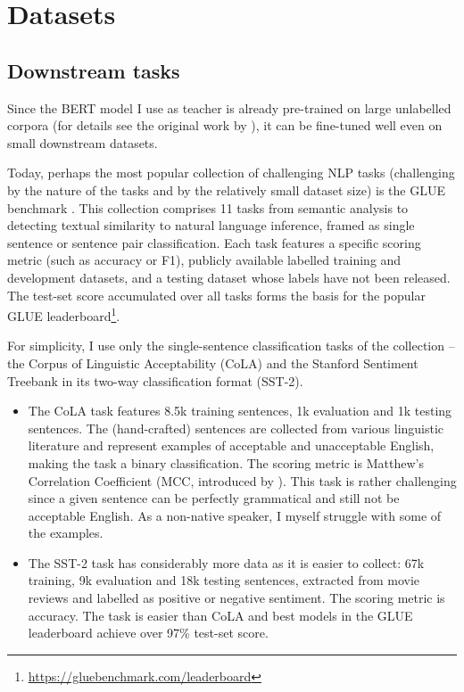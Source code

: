 \documentclass[bsc,frontabs,twoside,singlespacing,parskip,deptreport]{infthesis}
\begin{document}
\chapter{Datasets}{
  \section{Downstream tasks}{
    Since the BERT model I use as teacher is already pre-trained on large unlabelled corpora (for details see the original work by \citet{Devlin_2018}), it can be fine-tuned well even on small downstream datasets.

    Today, perhaps the most popular collection of challenging NLP tasks (challenging by the nature of the tasks and by the relatively small dataset size) is the GLUE benchmark \citep{Wang_2018}. This collection comprises 11 tasks from semantic analysis to detecting textual similarity to natural language inference, framed as single sentence or sentence pair classification. Each task features a specific scoring metric (such as accuracy or F1), publicly available labelled training and development datasets, and a testing dataset whose labels have not been released. The test-set score accumulated over all tasks forms the basis for the popular GLUE leaderboard\footnote{\url{https://gluebenchmark.com/leaderboard}}.
    
    For simplicity, I use only the single-sentence classification tasks of the collection -- the Corpus of Linguistic Acceptability (CoLA) and the Stanford Sentiment Treebank in its two-way classification format (SST-2).
    \begin{itemize}
      \item The CoLA task features 8.5k training sentences, 1k evaluation and 1k testing sentences. The (hand-crafted) sentences are collected from various linguistic literature and represent examples of acceptable and unacceptable English, making the task a binary classification. The scoring metric is Matthew's Correlation Coefficient (MCC, introduced by \citet{Matthews_1975}). This task is rather challenging since a given sentence can be perfectly grammatical and still not be acceptable English. As a non-native speaker, I myself struggle with some of the examples.
      \item The SST-2 task has considerably more data as it is easier to collect: 67k training, 9k evaluation and 18k testing sentences, extracted from movie reviews and labelled as positive or negative sentiment. The scoring metric is accuracy. The task is easier than CoLA and best models in the GLUE leaderboard achieve over 97\% test-set score.
    \end{itemize}

}}
\end{document}
